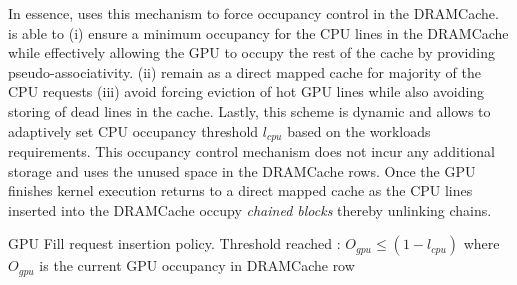 \par In essence, \cachename uses this \chaining mechanism to force occupancy control in the DRAMCache. \chaining is able to 
(i) ensure a minimum occupancy for the CPU lines in the DRAMCache while effectively allowing the GPU to occupy the rest of the cache by providing pseudo-associativity. 
(ii) remain as a direct mapped cache for majority of the CPU requests
(iii) avoid forcing eviction of hot GPU lines while also avoiding storing of dead lines in the cache.
Lastly, this scheme is dynamic and allows to adaptively set CPU occupancy threshold \textit{$l_{cpu}$} based on the workloads requirements. This occupancy control mechanism does not incur any additional storage and uses the unused space in the DRAMCache rows. Once the GPU finishes kernel execution \cachename returns to a direct mapped cache as the CPU lines inserted into the DRAMCache occupy \textit{chained blocks} thereby unlinking chains. 


\begin{table}[]
\centering
\small

\caption{GPU Fill request insertion policy. Threshold reached : $O_{gpu}\le(1-l_{cpu})$ where $O_{gpu}$ is the current GPU occupancy in DRAMCache row}
\label{chaining-replacement}
\end{table}
